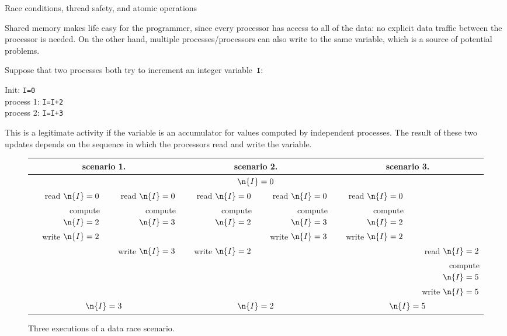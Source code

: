
 {Race conditions, thread safety, and atomic operations}
\label{sec:shared-lock}

Shared memory makes life easy for the programmer, since every
processor has access to all of the data: no explicit data traffic
between the processor is needed. On the other hand, multiple
processes/processors can also write to the same variable, which is a
source of potential problems.

Suppose that two processes both try to increment an integer
variable~\texttt{I}:

  \begin{tabbing}
    Init: \texttt{I=0}\\
    process 1: \texttt{I=I+2}\\
    process 2: \texttt{I=I+3}
  \end{tabbing}

This is a legitimate activity if the variable is an accumulator for
values computed by independent processes.
The result of these two updates
depends on the sequence in which the processors read and
write the variable.

\begin{figure}[ht]
  \begin{tabular}{rrrrrr}
    \toprule
    \multicolumn{2}{c}{scenario 1.}& \multicolumn{2}{c}{scenario 2.}&
    \multicolumn{2}{c}{scenario 3.}\\ \midrule
    \multicolumn{6}{c}{$\n{I}=0$}\\ \midrule
    read $\n{I}=0$&read $\n{I}=0$&
    read $\n{I}=0$&read $\n{I}=0$&
    read $\n{I}=0$& \\
    compute $\n{I}=2$&compute $\n{I}=3$& 
    compute $\n{I}=2$&compute $\n{I}=3$&
    compute $\n{I}=2$& \\
    write $\n{I}=2$& & &write $\n{I}=3$&write $\n{I}=2$& \\
    &write $\n{I}=3$&write $\n{I}=2$& & &read $\n{I}=2$\\
    &&&&&compute $\n{I}=5$\\
    &&&&&write $\n{I}=5$\\
    \midrule
    \multicolumn{2}{c}{$\n{I}=3$}& \multicolumn{2}{c}{$\n{I}=2$}&
        \multicolumn{2}{c}{$\n{I}=5$}
 \\ \bottomrule
  \end{tabular}
  \caption{Three executions of a data race scenario.}
  \label{fig:race}
\end{figure}

